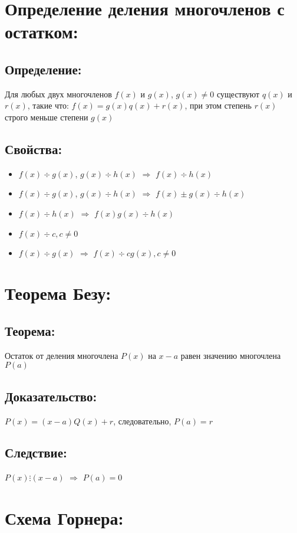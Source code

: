 \documentclass[12pt]{article}
\begin{document}
\section{Определение деления многочленов с остатком:}
\subsection{Определение:}
Для любых двух многочленов $f(x)$ и $g(x)$, $g(x)\neq {0}$ существуют $q(x)$ и $r(x)$, такие что: $f(x) = g(x)q(x) + r(x)$, при этом степень $r(x)$ строго меньше степени $g(x)$\par
\subsection{Свойства:}
\begin{itemize}
    \item $f(x) \div g(x)$, $g(x) \div h(x)$ $\Rightarrow$ $f(x) \div h(x)$
    \item $f(x) \div g(x)$, $g(x) \div h(x)$ $\Rightarrow$ $f(x){\pm}g(x) \div h(x)$
    \item $f(x) \div h(x)$ $\Rightarrow$ $f(x)g(x) \div h(x)$
    \item $f(x) \div c, c\neq{0}$ 
    \item $f(x) \div g(x)$ $\Rightarrow$ $f(x) \div cg(x), c\neq{0}$
\end{itemize}
\section{Теорема Безу:}
\subsection{Теорема:}
Остаток от деления многочлена $P(x)$ на $x-a$ равен значению многочлена $P(a)$
\subsection{Доказательство:}
$P(x) = (x − a)Q(x) + r$, следовательно, $P(a) = r$
\subsection{Следствие:}
$P(x) \vdots (x − a)$ $\Rightarrow$ $P(a) = 0$
\section{Схема Горнера:}     
\end{document}
